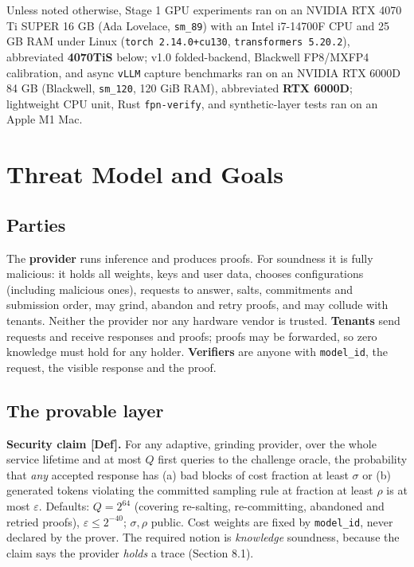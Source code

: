 \documentclass[10pt]{article}
\begin{document}
Unless noted otherwise, Stage 1 GPU experiments ran on an NVIDIA RTX 4070 Ti SUPER 16 GB (Ada Lovelace, \texttt{sm\_\allowbreak{}89}) with an Intel i7-14700F CPU and 25 GB RAM under Linux (\texttt{torch 2.\allowbreak{}14.\allowbreak{}0+cu130}, \texttt{transformers 5.\allowbreak{}20.\allowbreak{}2}), abbreviated \textbf{4070TiS} below; v1.0 folded-backend, Blackwell FP8/MXFP4 calibration, and async \texttt{vLLM} capture benchmarks ran on an NVIDIA RTX 6000D 84 GB (Blackwell, \texttt{sm\_\allowbreak{}120}, 120 GiB RAM), abbreviated \textbf{RTX 6000D}; lightweight CPU unit, Rust \texttt{fpn-verify}, and synthetic-layer tests ran on an Apple M1 Mac.

\section{Threat Model and Goals}
\subsection{Parties}
The \textbf{provider} runs inference and produces proofs. For soundness it is fully malicious: it holds all weights, keys and user data, chooses configurations (including malicious ones), requests to answer, salts, commitments and submission order, may grind, abandon and retry proofs, and may collude with tenants. Neither the provider nor any hardware vendor is trusted. \textbf{Tenants} send requests and receive responses and proofs; proofs may be forwarded, so zero knowledge must hold for any holder. \textbf{Verifiers} are anyone with \texttt{model\_\allowbreak{}id}, the request, the visible response and the proof.

\subsection{The provable layer}
\textbf{Security claim [Def].} For any adaptive, grinding provider, over the whole service lifetime and at most $Q$ first queries to the challenge oracle, the probability that \emph{any} accepted response has (a) bad blocks of cost fraction at least $\sigma$ or (b) generated tokens violating the committed sampling rule at fraction at least $\rho$ is at most $\varepsilon$. Defaults: $Q=2^{64}$ (covering re-salting, re-committing, abandoned and retried proofs), $\varepsilon\le2^{-40}$; $\sigma,\rho$ public. Cost weights are fixed by \texttt{model\_\allowbreak{}id}, never declared by the prover. The required notion is \emph{knowledge} soundness, because the claim says the provider \emph{holds} a trace (Section 8.1).
\end{document}
